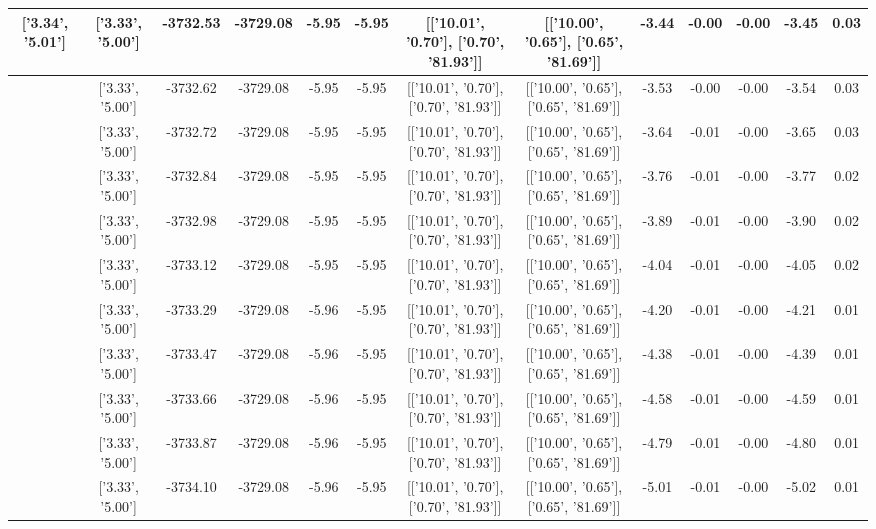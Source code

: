 \begin{table}[htbp]
\begin{adjustbox}{angle=90}
\begin{tabular}{|c|c|c|c|c|c|c|c|c|c|c|c|c|}
 ['3.34', '5.01'] & ['3.33', '5.00'] & -3732.53 & -3729.08 & -5.95 & -5.95 & [['10.01', '0.70'], ['0.70', '81.93']] & [['10.00', '0.65'], ['0.65', '81.69']] & -3.44 & -0.00 & -0.00 & -3.45 & 0.03\\ \hline
 ['3.34', '5.01'] & ['3.33', '5.00'] & -3732.62 & -3729.08 & -5.95 & -5.95 & [['10.01', '0.70'], ['0.70', '81.93']] & [['10.00', '0.65'], ['0.65', '81.69']] & -3.53 & -0.00 & -0.00 & -3.54 & 0.03\\ \hline
 ['3.34', '5.01'] & ['3.33', '5.00'] & -3732.72 & -3729.08 & -5.95 & -5.95 & [['10.01', '0.70'], ['0.70', '81.93']] & [['10.00', '0.65'], ['0.65', '81.69']] & -3.64 & -0.01 & -0.00 & -3.65 & 0.03\\ \hline
 ['3.34', '5.01'] & ['3.33', '5.00'] & -3732.84 & -3729.08 & -5.95 & -5.95 & [['10.01', '0.70'], ['0.70', '81.93']] & [['10.00', '0.65'], ['0.65', '81.69']] & -3.76 & -0.01 & -0.00 & -3.77 & 0.02\\ \hline
 ['3.34', '5.01'] & ['3.33', '5.00'] & -3732.98 & -3729.08 & -5.95 & -5.95 & [['10.01', '0.70'], ['0.70', '81.93']] & [['10.00', '0.65'], ['0.65', '81.69']] & -3.89 & -0.01 & -0.00 & -3.90 & 0.02\\ \hline
 ['3.34', '5.01'] & ['3.33', '5.00'] & -3733.12 & -3729.08 & -5.95 & -5.95 & [['10.01', '0.70'], ['0.70', '81.93']] & [['10.00', '0.65'], ['0.65', '81.69']] & -4.04 & -0.01 & -0.00 & -4.05 & 0.02\\ \hline
 ['3.34', '5.01'] & ['3.33', '5.00'] & -3733.29 & -3729.08 & -5.96 & -5.95 & [['10.01', '0.70'], ['0.70', '81.93']] & [['10.00', '0.65'], ['0.65', '81.69']] & -4.20 & -0.01 & -0.00 & -4.21 & 0.01\\ \hline
 ['3.35', '5.01'] & ['3.33', '5.00'] & -3733.47 & -3729.08 & -5.96 & -5.95 & [['10.01', '0.70'], ['0.70', '81.93']] & [['10.00', '0.65'], ['0.65', '81.69']] & -4.38 & -0.01 & -0.00 & -4.39 & 0.01\\ \hline
 ['3.35', '5.01'] & ['3.33', '5.00'] & -3733.66 & -3729.08 & -5.96 & -5.95 & [['10.01', '0.70'], ['0.70', '81.93']] & [['10.00', '0.65'], ['0.65', '81.69']] & -4.58 & -0.01 & -0.00 & -4.59 & 0.01\\ \hline
 ['3.35', '5.01'] & ['3.33', '5.00'] & -3733.87 & -3729.08 & -5.96 & -5.95 & [['10.01', '0.70'], ['0.70', '81.93']] & [['10.00', '0.65'], ['0.65', '81.69']] & -4.79 & -0.01 & -0.00 & -4.80 & 0.01\\ \hline
 ['3.35', '5.02'] & ['3.33', '5.00'] & -3734.10 & -3729.08 & -5.96 & -5.95 & [['10.01', '0.70'], ['0.70', '81.93']] & [['10.00', '0.65'], ['0.65', '81.69']] & -5.01 & -0.01 & -0.00 & -5.02 & 0.01\\ \hline

\end{tabular}
\end{adjustbox}
\end{table}
